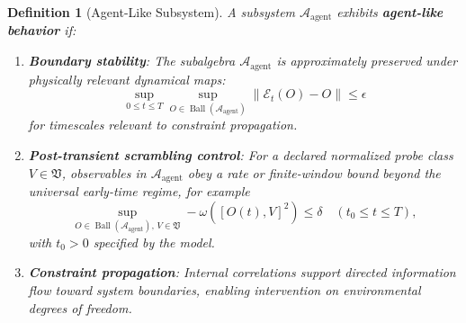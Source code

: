 \documentclass[12pt,a4paper,openany]{book}
\newtheorem{definition}[theorem]{Definition}
\begin{document}
\begin{definition}[Agent-Like Subsystem]
\label{C-def:agent-subsystem}
A subsystem $\mathcal{A}_{\text{agent}}$ exhibits \textbf{agent-like behavior} if:
\begin{enumerate}
\item \textbf{Boundary stability}: The subalgebra $\mathcal{A}_{\text{agent}}$ is approximately preserved under physically relevant dynamical maps:
\begin{equation}
\sup_{0\le t\le T}
\sup_{O\in\operatorname{Ball}(\mathcal A_{\text{agent}})}
\|\mathcal E_t(O)-O\|\le\epsilon
\end{equation}
for timescales relevant to constraint propagation.

\item \textbf{Post-transient scrambling control}: For a declared normalized probe class $V\in\mathfrak V$, observables in $\mathcal{A}_{\text{agent}}$ obey a rate or finite-window bound beyond the universal early-time regime, for example
\begin{equation}
\sup_{O\in\operatorname{Ball}(\mathcal A_{\text{agent}}),\,V\in\mathfrak V}
-\omega([O(t),V]^2)\le\delta
\quad(t_0\le t\le T),
\end{equation}
with $t_0>0$ specified by the model.

\item \textbf{Constraint propagation}: Internal correlations support directed information flow toward system boundaries, enabling intervention on environmental degrees of freedom.
\end{enumerate}
\end{definition}
\end{document}
